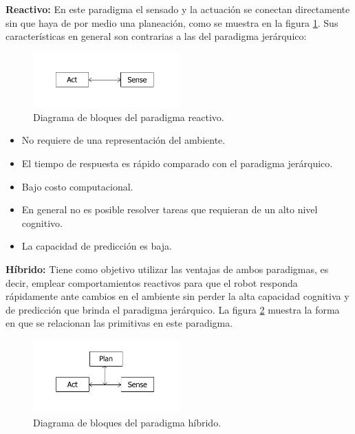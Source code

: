 \documentclass[letterpaper,12pt]{article}
\begin{document}
\textbf{Reactivo:} En este paradigma el sensado y la actuación se conectan directamente sin que haya de por medio una planeación, como se muestra en la figura \ref{fig:ParadigmReactive}. Sus características en general son contrarias a las del paradigma jerárquico:
\begin{figure}
  \centering
  \includegraphics[width=0.5\textwidth]{Figures/Reactive.png}
  \caption{Diagrama de bloques del paradigma reactivo. }
  \label{fig:ParadigmReactive}
\end{figure}
\begin{itemize}
\item No requiere de una representación del ambiente.
\item El tiempo de respuesta es rápido comparado con el paradigma jerárquico.
\item Bajo costo computacional.
\item En general no es posible resolver tareas que requieran de un alto nivel cognitivo.
\item La capacidad de predicción es baja. 
\end{itemize}

\textbf{Híbrido:} Tiene como objetivo utilizar las ventajas de ambos paradigmas, es decir, emplear comportamientos reactivos para que el robot responda rápidamente ante cambios en el ambiente sin perder la alta capacidad cognitiva y de predicción que brinda el paradigma jerárquico. La figura \ref{fig:ParadigmHybrid} muestra la forma en que se relacionan las primitivas en este paradigma. 
\begin{figure}
  \centering
  \includegraphics[width=0.5\textwidth]{Figures/Hybrid.png}
  \caption{Diagrama de bloques del paradigma híbrido.}
  \label{fig:ParadigmHybrid}
\end{figure}


\end{document}
